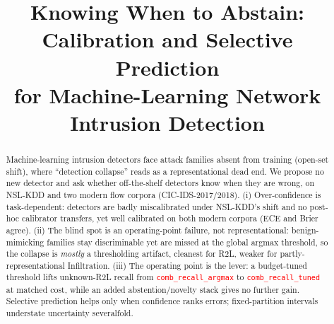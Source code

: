 \documentclass[conference,a4paper]{IEEEtran}
\newcommand{\PH}[1]{\textcolor{red}{\texttt{#1}}}
\begin{document}
\title{Knowing When to Abstain: Calibration and Selective Prediction\\
for Machine-Learning Network Intrusion Detection}

%
\author{
}

\maketitle
\thispagestyle{empty}

\pagestyle{empty}

\begin{abstract}
\boldmath
Machine-learning intrusion detectors face attack families absent from training (open-set shift), where
``detection collapse'' reads as a representational dead end. We propose no new detector and ask whether
off-the-shelf detectors know when they are wrong, on NSL-KDD and two modern flow corpora
(CIC-IDS-2017/2018). (i) Over-confidence is task-dependent: detectors are badly miscalibrated under
NSL-KDD's shift and no post-hoc calibrator transfers, yet well calibrated on both modern corpora (ECE and
Brier agree). (ii) The blind spot is an operating-point failure, not representational: benign-mimicking
families stay discriminable yet are missed at the global argmax threshold, so the collapse is \emph{mostly}
a thresholding artifact, cleanest for R2L, weaker for partly-representational Infiltration. (iii) The
operating point is the lever: a budget-tuned threshold lifts unknown-R2L recall from \PH{comb_recall_argmax}
to \PH{comb_recall_tuned} at matched cost, while an added abstention/novelty stack gives no further gain.
Selective prediction helps only when confidence ranks errors; fixed-partition intervals understate
uncertainty severalfold.
\end{abstract}
\end{document}
